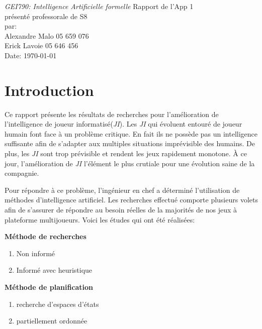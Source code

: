 \documentclass[12pt,english,frenchb,letterpaper]{article}
\begin{document}
\thispagestyle{empty}
\begin{center}
{\large\em GEI790:  Intelligence Artificielle formelle}
\vfill
Rapport de l'App 1\\
présenté professorale de S8\\
\vfill
par:\\
Alexandre Malo\hspace{2cm} 05 659 076\\
Erick Lavoie\hspace{2cm} 05 646 456\\
\vfill
Date: \today
\end{center}

\newpage
\onehalfspacing


\tableofcontents

\newpage


\section{Introduction}
Ce rapport présente les résultats de recherches pour l'amélioration de l'intelligence de joueur informatisé(\textit{JI}).
Les \textit{JI} qui évoluent entouré de joueur humain font face à un problème critique. En fait ils ne possède pas un intelligence suffisante afin de s'adapter aux multiples situations imprévisible des humains. De plus, les \textit{JI} sont trop prévisible et rendent les jeux rapidement monotone. À ce jour, l'amélioration de \textit{JI} l'élément le plus crutiale pour une évolution saine de la compagnie.

Pour répondre à ce problème, l'ingénieur en chef a déterminé l'utilisation de méthodes d'intelligence artificiel. Les recherches effectué comporte plusieurs volets afin de s'assurer de répondre au besoin réelles de la majorités de nos jeux à plateforme multijoueurs. Voici les études qui ont été réalisées:

\textbf{Méthode de recherches}
\begin{enumerate}
 \item Non informé
 \item Informé avec heuristique
\end{enumerate}

\textbf{Méthode de planification}
\begin{enumerate}
 \item recherche d'espaces d'états
 \item partiellement ordonnée
\end{enumerate}
\end{document}
